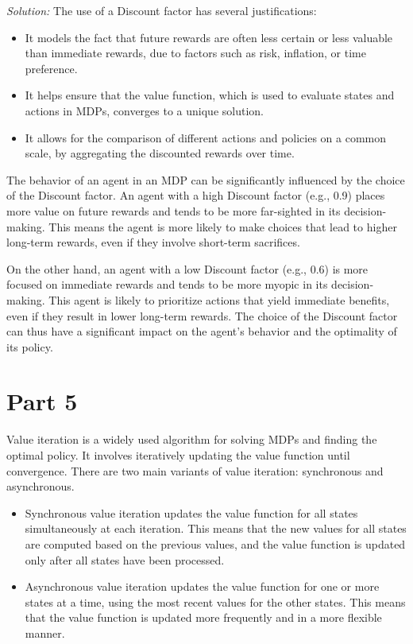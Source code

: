 \documentclass[a4paper, 11pt]{article}
\newenvironment{solution}
    {\textit{Solution:}}
    {}
\begin{document}
{\begin{solution}
The use of a Discount factor has several justifications:
\begin{itemize}
	\item It models the fact that future rewards are often less certain or less valuable than immediate rewards, due to factors such as risk, inflation, or time preference.
	\item It helps ensure that the value function, which is used to evaluate states and actions in MDPs, converges to a unique solution.
	\item It allows for the comparison of different actions and policies on a common scale, by aggregating the discounted rewards over time.
\end{itemize}

The behavior of an agent in an MDP can be significantly influenced by the choice of the Discount factor. An agent with a high Discount factor (e.g., 0.9) places more value on future rewards and tends to be more far-sighted in its decision-making. This means the agent is more likely to make choices that lead to higher long-term rewards, even if they involve short-term sacrifices.

On the other hand, an agent with a low Discount factor (e.g., 0.6) is more focused on immediate rewards and tends to be more myopic in its decision-making. This agent is likely to prioritize actions that yield immediate benefits, even if they result in lower long-term rewards. The choice of the Discount factor can thus have a significant impact on the agent's behavior and the optimality of its policy.

	\section*{\small Part 5}
Value iteration is a widely used algorithm for solving MDPs and finding the optimal policy. It involves iteratively updating the value function until convergence. There are two main variants of value iteration: synchronous and asynchronous.
\begin{itemize}
	\item Synchronous value iteration updates the value function for all states simultaneously at each iteration. This means that the new values for all states are computed based on the previous values, and the value function is updated only after all states have been processed.
	\item Asynchronous value iteration updates the value function for one or more states at a time, using the most recent values for the other states. This means that the value function is updated more frequently and in a more flexible manner.
\end{itemize}


\end{solution}}
\end{document}
